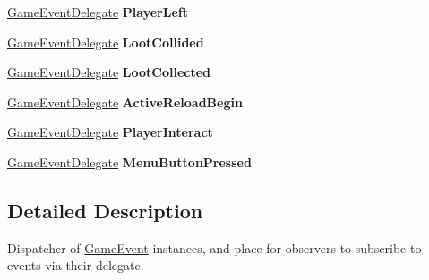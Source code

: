 \begin{DoxyCompactItemize}
\item 
\hypertarget{class_skyrates_1_1_game_1_1_event_1_1_game_events_aa3342458cac65ccd75acfa4f69f32fa2}{\hyperlink{namespace_skyrates_1_1_game_1_1_event_a06bcdcadb00cfbf4d4ebd1b2e6ad623d}{Game\-Event\-Delegate} {\bfseries Player\-Left}}\label{class_skyrates_1_1_game_1_1_event_1_1_game_events_aa3342458cac65ccd75acfa4f69f32fa2}

\item 
\hypertarget{class_skyrates_1_1_game_1_1_event_1_1_game_events_ab5f56a9fb8e42f58831c02a11d4bfe58}{\hyperlink{namespace_skyrates_1_1_game_1_1_event_a06bcdcadb00cfbf4d4ebd1b2e6ad623d}{Game\-Event\-Delegate} {\bfseries Loot\-Collided}}\label{class_skyrates_1_1_game_1_1_event_1_1_game_events_ab5f56a9fb8e42f58831c02a11d4bfe58}

\item 
\hypertarget{class_skyrates_1_1_game_1_1_event_1_1_game_events_acd58256ab56e91770ae49bf32aa27438}{\hyperlink{namespace_skyrates_1_1_game_1_1_event_a06bcdcadb00cfbf4d4ebd1b2e6ad623d}{Game\-Event\-Delegate} {\bfseries Loot\-Collected}}\label{class_skyrates_1_1_game_1_1_event_1_1_game_events_acd58256ab56e91770ae49bf32aa27438}

\item 
\hypertarget{class_skyrates_1_1_game_1_1_event_1_1_game_events_ae6bf7dea015043a881d273cc1161a894}{\hyperlink{namespace_skyrates_1_1_game_1_1_event_a06bcdcadb00cfbf4d4ebd1b2e6ad623d}{Game\-Event\-Delegate} {\bfseries Active\-Reload\-Begin}}\label{class_skyrates_1_1_game_1_1_event_1_1_game_events_ae6bf7dea015043a881d273cc1161a894}

\item 
\hypertarget{class_skyrates_1_1_game_1_1_event_1_1_game_events_a27c47915b50c6628f2b30387b9f6ce69}{\hyperlink{namespace_skyrates_1_1_game_1_1_event_a06bcdcadb00cfbf4d4ebd1b2e6ad623d}{Game\-Event\-Delegate} {\bfseries Player\-Interact}}\label{class_skyrates_1_1_game_1_1_event_1_1_game_events_a27c47915b50c6628f2b30387b9f6ce69}

\item 
\hypertarget{class_skyrates_1_1_game_1_1_event_1_1_game_events_aa5fce053e9143fcc888e6316a8842ce8}{\hyperlink{namespace_skyrates_1_1_game_1_1_event_a06bcdcadb00cfbf4d4ebd1b2e6ad623d}{Game\-Event\-Delegate} {\bfseries Menu\-Button\-Pressed}}\label{class_skyrates_1_1_game_1_1_event_1_1_game_events_aa5fce053e9143fcc888e6316a8842ce8}

\end{DoxyCompactItemize}


\subsection{Detailed Description}
Dispatcher of \hyperlink{class_skyrates_1_1_game_1_1_event_1_1_game_event}{Game\-Event} instances, and place for observers to subscribe to events via their delegate. 



